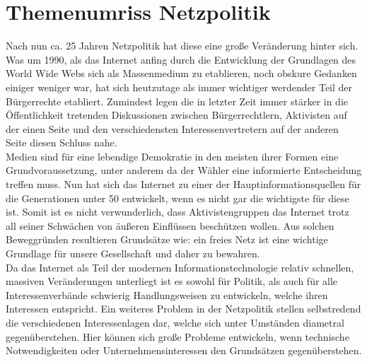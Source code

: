 \documentclass[
	12pt,
	a4paper,
	BCOR10mm,
	DIV14,
	listof=totoc,
	bibliography=totoc,
	headsepline
]{scrreprt}
\begin{document}
\section{Themenumriss Netzpolitik}
\label{themeintro}
Nach nun ca. 25 Jahren Netzpolitik hat diese eine große Veränderung hinter sich.
Was um 1990, als das Internet anfing durch die Entwicklung der Grundlagen des World Wide Webs sich als Massenmedium zu etablieren, noch obskure Gedanken einiger weniger war, hat sich heutzutage als immer wichtiger werdender Teil der Bürgerrechte etabliert.
Zumindest legen die in letzter Zeit immer stärker in die Öffentlichkeit tretenden Diskussionen zwischen Bürgerrechtlern, Aktivisten auf der einen Seite und den verschiedensten Interessenvertretern auf der anderen Seite diesen Schluss nahe. \\
Medien sind für eine lebendige Demokratie in den meisten ihrer Formen eine Grundvoraussetzung, unter anderem da der Wähler eine informierte Entscheidung treffen muss.
Nun hat sich das Internet zu einer der Hauptinformationsquellen für die Generationen unter 50 entwickelt, wenn es nicht gar die wichtigste für diese ist.
Somit ist es nicht verwunderlich, dass Aktivistengruppen das Internet trotz all seiner Schwächen von äußeren Einflüssen beschützen wollen.
Aus solchen Beweggründen resultieren Grundsätze wie: ein freies Netz ist eine wichtige Grundlage für unsere Gesellschaft und daher zu bewahren. \\
Da das Internet als Teil der modernen Informationstechnologie relativ schnellen, massiven Veränderungen unterliegt ist es sowohl für Politik, als auch für alle Interessenverbände schwierig Handlungsweisen zu entwickeln, welche ihren Interessen entspricht.
Ein weiteres Problem in der Netzpolitik stellen selbstredend die verschiedenen Interessenlagen dar, welche sich unter Umständen diametral gegenüberstehen.
Hier können sich große Probleme entwickeln, wenn technische Notwendigkeiten oder Unternehmensinteressen den Grundsätzen gegenüberstehen.

{}
\end{document}
